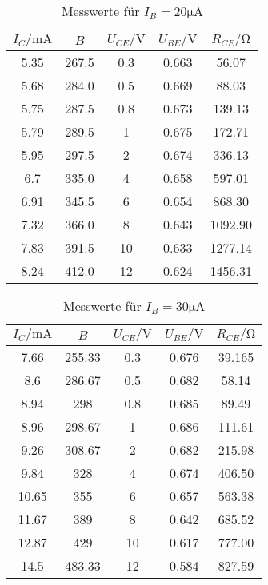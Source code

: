 \documentclass[a4paper, 12pt]{article}
\begin{document}
\begin{table}[H]
  \begin{center}
\begin{tabular}{@{}ccccc@{}}
\toprule
$I_C / \si{\milli\ampere}$ & $B$                & $U_{CE} / \si{\volt}$ & $U_{BE} / \si{\volt}$ & $R_{CE} / \si{\ohm}$           \\ \midrule
5.35 & 267.5              & 0.3 & 0.663 & 56.07\\
5.68 & 284.0& 0.5 & 0.669 & 88.03\\
5.75 & 287.5              & 0.8 & 0.673 & 139.13\\
5.79 & 289.5              & 1   & 0.675 & 172.71\\
5.95 & 297.5& 2   & 0.674 & 336.13\\
6.7  & 335.0& 4   & 0.658 & 597.01\\
6.91 & 345.5& 6   & 0.654 & 868.30\\
7.32 & 366.0& 8   & 0.643 & 1092.90\\
7.83 & 391.5& 10  & 0.633 & 1277.14\\
8.24 & 412.0& 12  & 0.624 & 1456.31\\ \bottomrule
\end{tabular}
\end{center}
\caption{Messwerte für $I_B = 20 \si{\micro\ampere}$}
\end{table}

\begin{table}[H]
  \begin{center}
\begin{tabular}{@{}ccccc@{}}
\toprule
$I_C / \si{\milli\ampere}$ & $B$                & $U_{CE} / \si{\volt}$ & $U_{BE} / \si{\volt}$ & $R_{CE} / \si{\ohm}$           \\ \midrule
7.66  & 255.33& 0.3 & 0.676 & 39.165\\
8.6   & 286.67& 0.5 & 0.682 & 58.14\\
8.94  & 298                & 0.8 & 0.685 & 89.49\\
8.96  & 298.67& 1   & 0.686 & 111.61\\
9.26  & 308.67& 2   & 0.682 & 215.98\\
9.84  & 328                & 4   & 0.674 & 406.50\\
10.65 & 355                & 6   & 0.657 & 563.38\\
11.67 & 389                & 8   & 0.642 & 685.52\\
12.87 & 429                & 10  & 0.617 & 777.00\\
14.5  & 483.33& 12  & 0.584 & 827.59\\ \bottomrule
\end{tabular}
\end{center}
\caption{Messwerte für $I_B = 30 \si{\micro\ampere}$}
\end{table}
\end{document}
